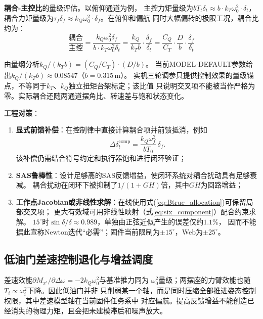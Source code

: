 \textbf{耦合-主控比}的量级评估。以俯仰通道为例，
主控力矩量级为$b T_t \delta_t \approx b \cdot k_T \omega_0^2 \cdot \delta_t$，
耦合力矩量级为$\tau_f \delta_f \approx k_Q \omega_0^2 \cdot \delta_f$。在俯仰和偏航
同时大幅偏转的极限工况，耦合比约为：
\begin{equation}
    \frac{\text{耦合}}{\text{主控}}
    = \frac{k_Q \omega_0^2 \delta_f}{b \cdot k_T \omega_0^2 \delta_t}
    = \frac{k_Q}{k_T b} \cdot \frac{\delta_f}{\delta_t}
    = \frac{C_Q}{C_T} \cdot \frac{D}{b} \cdot \frac{\delta_f}{\delta_t}
    \label{eq:coupling_ratio}
\end{equation}

由量纲分析$k_Q / (k_T b) = (C_Q / C_T) \cdot (D / b)$。
当前MODEL-DEFAULT参数给出$k_Q/(k_Tb)\approx0.08547$（$b=0.315$\,m）。
实机三轮调参只提供控制效果的量级锚点，不等同于$k_T$、$k_Q$独立扭矩台架标定；该比值
只说明交叉项不能被当作严格为零。实际耦合还随两通道摆角比、转速差与饱和状态变化。

\textbf{工程对策}：
\begin{enumerate}[label=(\arabic*)]
    \item \textbf{显式前馈补偿}：在控制律中直接计算耦合项并前馈抵消，例如
          \begin{equation*}
              \Delta \delta_t^{\text{comp}}
              = \frac{k_Q \omega_f^2}{b T_0}\,\delta_f .
          \end{equation*}
          该补偿仍需结合符号约定和执行器饱和进行闭环验证；
    \item \textbf{SAS鲁棒性}：设计足够高的SAS反馈增益，使闭环系统对耦合扰动具有足够衰减。
          耦合扰动在闭环下被抑制了$1/(1+GH)$倍，其中$GH$为回路增益；
    \item \textbf{工作点Jacobian或非线性求解}：在线使用式(\ref{eq:Btrue_allocation})可保留局部交叉项；
          更大有效域可用非线性映射（式\ref{eq:six_component}）配合约束求解。
          $15^\circ$时$\sin\delta/\delta\approx0.989$，单独由正弦近似产生的误差仅约$1.1\%$，
          因而不能据此宣称Newton迭代“必需”；固件当前限制为$\pm15^\circ$，Web为$\pm25^\circ$。
\end{enumerate}

\subsection{低油门差速控制退化与增益调度}

差速效能$\partial M_{x'}/\partial\Delta\omega=-2k_Q\omega_0^2$与基准推力同为
$\omega_0^2$量级；两摆座的力臂效能也随$T_i\propto\omega_i^2$下降。因此低油门并非
只削弱某一个轴，而是同时压缩全部推进姿态控制权限，其中差速模型轴在当前固件任务系中
对应偏航。提高反馈增益不能创造已经消失的物理力矩，且会把未建模滞后和噪声放大。

